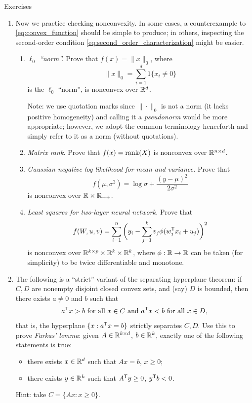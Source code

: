 \begin{xcb}{Exercises}
\begin{enumerate}[label=\thechapter.\arabic*]
\item Now we practice checking nonconvexity. In some cases, a counterexample to
  \eqref{eq:convex_function} should be simple to produce; in others, inspecting
  the second-order condition \eqref{eq:second_order_characterization} might be
  easier.  

\begin{enumerate}[label=\alph*.]
\item \emph{$\ell_0$ ``norm''.}  Prove that $f(x) = \|x\|_0$, where
  \begin{equation}
  \label{eq:l0_norm}
  \|x\|_0 = \sum_{i=1}^d 1\{x_i \not= 0\}
  \end{equation}
  is the $\ell_0$ ``norm'', is nonconvex over $\mathbb{R}^d$.

  \smallskip
  Note: we use quotation marks since $\|\cdot\|_0$ is not a norm (it lacks
  positive homogeneity) and calling it a \emph{pseudonorm} would be more
  appropriate; however, we adopt the common terminology henceforth and simply
  refer to it as a norm (without quotations).   

\item \emph{Matrix rank.} Prove that $f(x) = \operatorname{rank}(X)$ is nonconvex over $\mathbb{R}^{n
    \times d}$.   

\item \emph{Gaussian negative log likelihood for mean and variance.} Prove that  
  \[
  f(\mu, \sigma^2) = \log \sigma + \frac{(y - \mu)^2}{2\sigma^2}
  \]
  is nonconvex over $\mathbb{R} \times \mathbb{R}_{++}$.

\item \emph{Least squares for two-layer neural network.} Prove that 
  \[
  f(W, u, v) = \sum_{i=1}^n \bigg( y_i - \sum_{j=1}^k v_j 
  \phi (w_j^{\mathsf{T}} x_i + u_j) \bigg)^2 
  \]
  is nonconvex over $\mathbb{R}^{k \times p} \times \mathbb{R}^k \times \mathbb{R}^k$, where $\phi : \mathbb{R}
  \to \mathbb{R}$ can be taken (for simplicity) to be twice differentiable and monotone.    
\end{enumerate}

\item \label{ex:farkas} 
  The following is a ``strict'' variant of the separating hyperplane theorem: if 
  $C,D$ are nonempty disjoint closed convex sets, and (say) $D$ is bounded, 
  then there exists $a \not=0 $ and $b$ such that 
  \[
  \text{$a^{\mathsf{T}} x > b$ for all $x \in C$ and $a^{\mathsf{T}} x < b$ for all $x \in D$},
  \]  
  that is, the hyperplane $\{x: a^{\mathsf{T}} x =  b\}$ strictly separates $C,D$. 
  Use this to prove \emph{Farkas' lemma}: given $A \in \mathbb{R}^{k \times d}$, $b \in 
  \mathbb{R}^k$, exactly one of the following statements is true: 
  \begin{itemize}
  \item there exists $x \in \mathbb{R}^d$ such that $Ax=b$, $x \geq 0$;
  \item there exists $y \in \mathbb{R}^k$ such that $A^{\mathsf{T}} y \geq 0$, $y^{\mathsf{T}} b < 0$. 
  \end{itemize}
  Hint: take $C = \{Ax : x \geq 0\}$. 


\end{enumerate}
\end{xcb}
